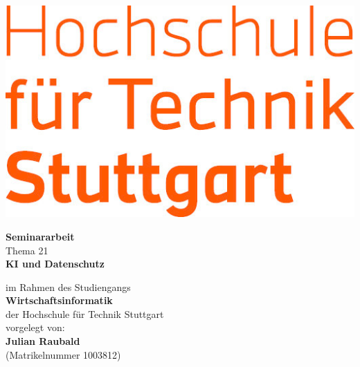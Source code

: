 \begin{titlepage}
    \begin{center}
        \includegraphics{figures/HFT-Logo.jpg}\\
        \normalsize
        \sffamily
        
        \vspace{0.5cm} 
        
        \Huge
        \textbf{Seminararbeit}\\
        \Large
        Thema 21\\
        \Huge
        \textbf{KI und Datenschutz}
        \vfill
        
        \normalsize
        \vspace{0.4cm}
        
        im Rahmen des Studiengangs\\
        \textbf{Wirtschaftsinformatik}\\
        der Hochschule für Technik Stuttgart\\

        
        \vspace{0.8cm}
        vorgelegt von: \\
        \large
        \textbf{Julian Raubald}\\ 
        (Matrikelnummer 1003812)\\
        

\end{center}
\end{titlepage}
